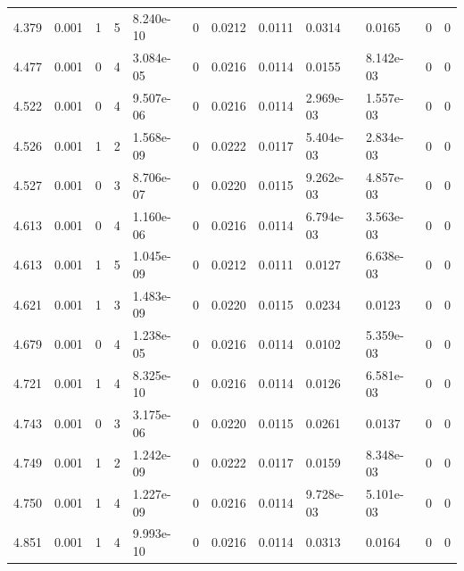 \documentclass[preview]{standalone}
\begin{document}
{{{\begin{tabular}{L{1.2cm}C{1.2cm} C{0.3cm}C{0.5cm} C{1.4cm}C{1.4cm} C{1.4cm}C{1.4cm} C{1.6cm}C{1.6cm} C{1.6cm}C{1.6cm}}
  4.379  &  0.001  & 1     &  5 &  8.240e-10  & 0  &  0.0212&   0.0111& 0.0314 & 0.0165   &  0 & 0  \\ 
  4.477  &  0.001  & 0     &  4 &  3.084e-05  & 0  &  0.0216&   0.0114& 0.0155 & 8.142e-03   &  0 & 0  \\ 
  4.522  &  0.001  & 0     &  4 &  9.507e-06  & 0  &  0.0216&   0.0114& 2.969e-03 & 1.557e-03   &  0 & 0  \\ 
  4.526  &  0.001  & 1     &  2 &  1.568e-09  & 0  &  0.0222&   0.0117& 5.404e-03 & 2.834e-03   &  0 & 0  \\ 
  4.527  &  0.001  & 0     &  3 &  8.706e-07  & 0  &  0.0220&   0.0115& 9.262e-03 & 4.857e-03   &  0 & 0  \\ 
  4.613  &  0.001  & 0     &  4 &  1.160e-06  & 0  &  0.0216&   0.0114& 6.794e-03 & 3.563e-03   &  0 & 0  \\ 
  4.613  &  0.001  & 1     &  5 &  1.045e-09  & 0  &  0.0212&   0.0111& 0.0127 & 6.638e-03   &  0 & 0  \\ 
  4.621  &  0.001  & 1     &  3 &  1.483e-09  & 0  &  0.0220&   0.0115& 0.0234 & 0.0123   &  0 & 0  \\ 
  4.679  &  0.001  & 0     &  4 &  1.238e-05  & 0  &  0.0216&   0.0114& 0.0102 & 5.359e-03   &  0 & 0  \\ 
  4.721  &  0.001  & 1     &  4 &  8.325e-10  & 0  &  0.0216&   0.0114& 0.0126 & 6.581e-03   &  0 & 0  \\ 
  4.743  &  0.001  & 0     &  3 &  3.175e-06  & 0  &  0.0220&   0.0115& 0.0261 & 0.0137   &  0 & 0  \\ 
  4.749  &  0.001  & 1     &  2 &  1.242e-09  & 0  &  0.0222&   0.0117& 0.0159 & 8.348e-03   &  0 & 0  \\ 
  4.750  &  0.001  & 1     &  4 &  1.227e-09  & 0  &  0.0216&   0.0114& 9.728e-03 & 5.101e-03   &  0 & 0  \\ 
  4.851  &  0.001  & 1     &  4 &  9.993e-10  & 0  &  0.0216&   0.0114& 0.0313 & 0.0164   &  0 & 0  \\ 
\hline 
\end{tabular} 

}}}
\end{document}

